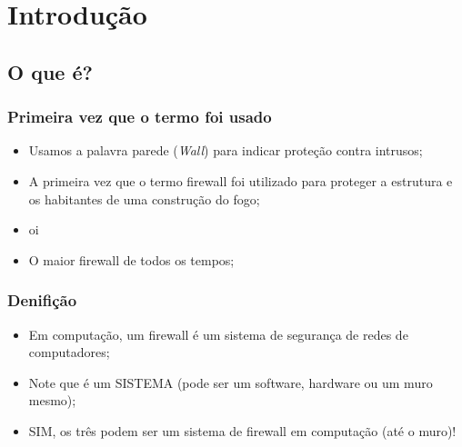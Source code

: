 \section{Introdução} 

\subsection{O que é?} %

\begin{frame}
	\frametitle{Primeira vez que o termo foi usado}

	\begin{itemize}
		\item Usamos a palavra parede (\textit{Wall}) para indicar proteção contra intrusos;
		\item A primeira vez que o termo firewall foi utilizado para proteger a estrutura e os habitantes de uma construção do fogo;
		\item \cite{aurelio} oi
		\item O maior firewall de todos os tempos;
	\end{itemize}

\end{frame}
\begin{frame}
	\frametitle{Denifição}

	\begin{itemize}
		\item Em computação, um firewall é um sistema de segurança de redes de computadores;
		\item Note que é um SISTEMA (pode ser um software, hardware ou um muro mesmo);
		\item SIM, os três podem ser um sistema de firewall em computação (até o muro)!
	\end{itemize}

\end{frame}


\newcommand{\ondefire}[3]{
	\begin{frame}
		\frametitle{#1}
		\begin{figure}
			\centering
			\texttt{[image: imagens/\#3]}
			\caption{#2}
		\end{figure}
	\end{frame}
}

